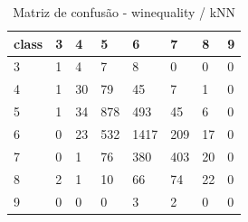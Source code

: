 \begin{table}[htbp]
\centering
\begin{tabular}{llllllll}
\hline
class & 3 & 4 & 5 & 6 & 7 & 8 & 9 \\
\hline
3 & 1 & 4 & 7 & 8 & 0 & 0 & 0 \\
4 & 1 & 30 & 79 & 45 & 7 & 1 & 0 \\
5 & 1 & 34 & 878 & 493 & 45 & 6 & 0 \\
6 & 0 & 23 & 532 & 1417 & 209 & 17 & 0 \\
7 & 0 & 1 & 76 & 380 & 403 & 20 & 0 \\
8 & 2 & 1 & 10 & 66 & 74 & 22 & 0 \\
9 & 0 & 0 & 0 & 3 & 2 & 0 & 0 \\
\hline
\end{tabular}
\caption{Matriz de confusão - winequality / kNN}
\label{tab:ex3-winequality-knn-cm}
\end{table}